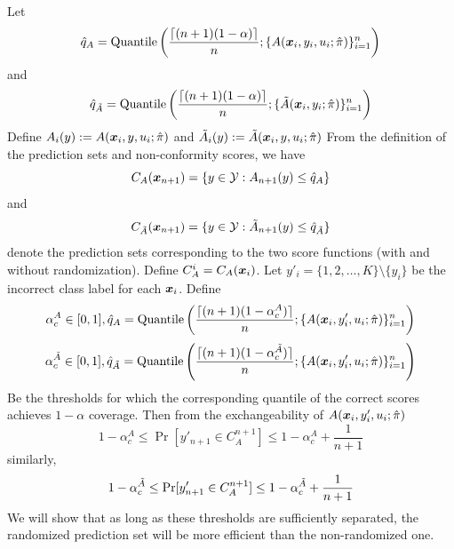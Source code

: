 Let 
\[
    \hat{q}_{A} = \text{Quantile}\left(\frac{\lceil(n+1)(1-\alpha)\rceil}{n}; \{A({\bm{x}}_i, y_i, u_i; \hat{\pi})\}_{i=1}^{n}\right)
\]
and
\[
    \hat{q}_{\Tilde{A}} = \text{Quantile}\left(\frac{\lceil(n+1)(1-\alpha)\rceil}{n}; \{\Tilde{A}({\bm{x}}_i, y_i; \hat{\pi})\}_{i=1}^{n}\right)
\]
Define $A_i(y) := A({\bm{x}}_i, y, u_i; \hat{\pi})$ and $\Tilde{A}_i(y) := \Tilde{A}({\bm{x}}_i, y, u_i; \hat{\pi})$
From the definition of the prediction sets and non-conformity scores, we have 
\[
    C_A({\bm{x}}_{n+1}) = \{y \in {\mathcal{Y}}: A_{n+1}(y) \leq \hat{q}_{A}\}
\] and 
\[
    C_{\Tilde{A}}({\bm{x}}_{n+1}) = \{y \in {\mathcal{Y}}: \Tilde{A}_{n+1}(y) \leq \hat{q}_{\Tilde{A}}\}
\] 
denote the prediction sets corresponding to the two score functions (with and without randomization).
Define $C_{A}^{i} = C_{A}({\bm{x}}_{i})$. 
Let $y'_i = \{1, 2, \dots, K\} \setminus \{y_i\}$ be the incorrect class label for each ${\bm{x}}_i$.
Define 
\[
    \alpha_c^A \in [0, 1], \hat{q}_A = \text{Quantile}\left( \frac{\lceil(n+1)(1 - \alpha_c^A)\rceil}{n}; \{A({\bm{x}}_i, y'_i, u_i; \hat{\pi})\}_{i=1}^n \right)
\]
\[
    \alpha_c^{\Tilde{A}} \in [0, 1], \hat{q}_{\Tilde{A}} = \text{Quantile}\left( \frac{\lceil(n+1)(1 - \alpha_c^{\Tilde{A}})\rceil}{n}; \{A({\bm{x}}_i, y'_i, u_i; \hat{\pi})\}_{i=1}^n \right)
\]    
Be the thresholds for which the corresponding quantile of the correct scores achieves $1-\alpha$ coverage.
Then from the exchangeability of $A({\bm{x}}_i, y'_i, u_i; \hat{\pi})$
\[
    1 - \alpha_c^A \leq \Pr[y'_{n+1} \in C_{A}^{n+1}] \leq 1 - \alpha_c^A + \frac{1}{n+1}
\]
similarly,
\[
    1 - \alpha_c^{\Tilde{A}} \leq \Pr[y'_{n+1} \in C_{A}^{n+1}] \leq 1 - \alpha_c^{\Tilde{A}} + \frac{1}{n+1}
\]
We will show that as long as these thresholds are sufficiently separated, the randomized prediction set will be more efficient than the non-randomized one. 

